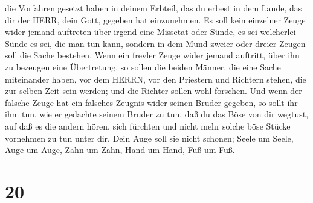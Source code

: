 die Vorfahren gesetzt haben in deinem Erbteil, das du erbest in dem
Lande, das dir der HERR, dein Gott, gegeben hat einzunehmen.
 Es soll kein einzelner Zeuge wider jemand auftreten über
irgend eine Missetat oder Sünde, es sei welcherlei Sünde es sei, die man
tun kann, sondern in dem Mund zweier oder dreier Zeugen soll die Sache
bestehen.  Wenn ein frevler Zeuge wider jemand auftritt,
über ihn zu bezeugen eine Übertretung,  so sollen die
beiden Männer, die eine Sache miteinander haben, vor dem HERRN, vor den
Priestern und Richtern stehen, die zur selben Zeit sein werden;
 und die Richter sollen wohl forschen. Und wenn der falsche
Zeuge hat ein falsches Zeugnis wider seinen Bruder gegeben,
 so sollt ihr ihm tun, wie er gedachte seinem Bruder zu
tun, daß du das Böse von dir wegtust,  auf daß es die
andern hören, sich fürchten und nicht mehr solche böse Stücke vornehmen
zu tun unter dir.  Dein Auge soll sie nicht schonen; Seele
um Seele, Auge um Auge, Zahn um Zahn, Hand um Hand, Fuß um Fuß.

\hypertarget{section-19}{%
\section{20}\label{section-19}}

